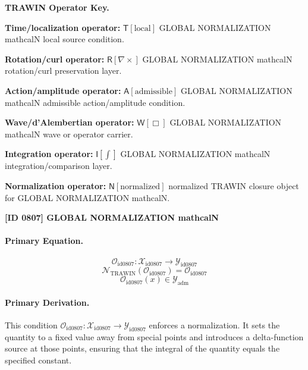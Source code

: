 \par\vspace{0.45\baselineskip}
\noindent\begin{minipage}[t]{\linewidth}
\begingroup
\small
\raggedright
\textbf{TRAWIN Operator Key.}\par
\noindent\textbf{Time/localization operator:} $\mathsf{T}\!\left[\mathrm{local}\right]$ GLOBAL NORMALIZATION mathcalN local source condition.\par
\noindent\textbf{Rotation/curl operator:} $\mathsf{R}\!\left[\nabla\times\right]$ GLOBAL NORMALIZATION mathcalN rotation/curl preservation layer.\par
\noindent\textbf{Action/amplitude operator:} $\mathsf{A}\!\left[\mathrm{admissible}\right]$ GLOBAL NORMALIZATION mathcalN admissible action/amplitude condition.\par
\noindent\textbf{Wave/d'Alembertian operator:} $\mathsf{W}\!\left[\Box\right]$ GLOBAL NORMALIZATION mathcalN wave or operator carrier.\par
\noindent\textbf{Integration operator:} $\mathsf{I}\!\left[\int\right]$ GLOBAL NORMALIZATION mathcalN integration/comparison layer.\par
\noindent\textbf{Normalization operator:} $\mathsf{N}\!\left[\mathrm{normalized}\right]$ normalized TRAWIN closure object for GLOBAL NORMALIZATION mathcalN.\par
\endgroup
\end{minipage}

\clearpage
\noindent\textbf{[ID 0807] GLOBAL NORMALIZATION mathcalN}\par
\vspace{0.35em}
\paragraph{Primary Equation.}
\[
\mathcal{O}_{\mathrm{id0807}}:\mathcal{X}_{\mathrm{id0807}}\longrightarrow\mathcal{Y}_{\mathrm{id0807}}
\]
\[
\mathcal{N}_{\mathrm{TRAWIN}}(\mathcal{O}_{\mathrm{id0807}})=\mathcal{O}_{\mathrm{id0807}}
\]
\[
\mathcal{O}_{\mathrm{id0807}}(x)\in\mathcal{Y}_{\mathrm{adm}}
\]

\paragraph{Primary Derivation.}
This condition \( \mathcal{O}_{\mathrm{id0807}}:\mathcal{X}_{\mathrm{id0807}}\longrightarrow\mathcal{Y}_{\mathrm{id0807}} \) enforces a normalization. It sets the quantity to a fixed value away from special points and introduces a delta-function source at those points, ensuring that the integral of the quantity equals the specified constant.
